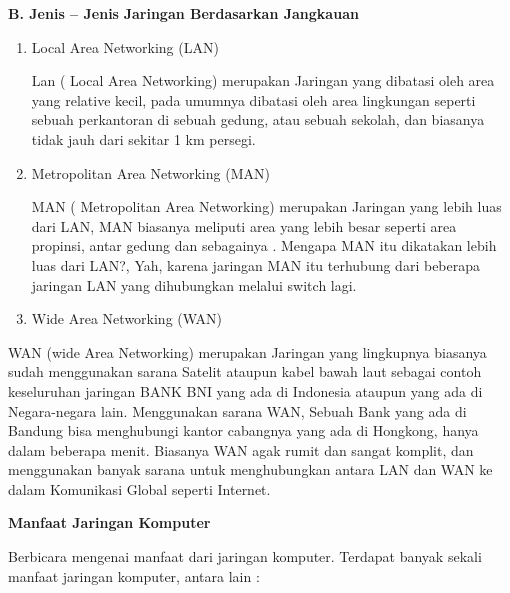 \noindent 
\textbf{B. Jenis – Jenis}\textbf{ Jaringan Berdasarkan Jangkauan} \par
\noindent 
\begin{enumerate}
\item Local Area Networking (LAN) \par
Lan ( Local Area Networking) merupakan Jaringan yang dibatasi oleh area yang relative kecil, pada umumnya dibatasi oleh area lingkungan seperti sebuah perkantoran di sebuah gedung, atau sebuah sekolah, dan biasanya tidak jauh dari sekitar 1 km persegi. \par
\noindent 
\item Metropolitan Area Networking (MAN) \par
MAN ( Metropolitan Area Networking) merupakan Jaringan yang lebih luas dari LAN, MAN biasanya meliputi area yang lebih besar seperti area propinsi, antar gedung dan sebagainya . Mengapa MAN itu dikatakan lebih luas dari LAN?, Yah, karena jaringan MAN itu terhubung dari beberapa jaringan LAN yang dihubungkan melalui switch lagi. \par
\vspace{12pt}
\noindent 
\item Wide Area Networking (WAN)\end{enumerate}
 \par
WAN (wide Area Networking) merupakan Jaringan yang lingkupnya biasanya sudah menggunakan sarana Satelit ataupun kabel bawah laut sebagai contoh keseluruhan jaringan BANK BNI yang ada di Indonesia ataupun yang ada di Negara-negara lain. Menggunakan sarana WAN, Sebuah Bank yang ada di Bandung bisa menghubungi kantor cabangnya yang ada di Hongkong, hanya dalam beberapa menit. Biasanya WAN agak rumit dan sangat komplit, dan menggunakan banyak sarana untuk menghubungkan antara LAN dan WAN ke dalam Komunikasi Global seperti Internet. \par
\vspace{12pt}
\noindent 
\textbf{Manfaat Jaringan Komputer} \par
Berbicara mengenai manfaat dari jaringan komputer. Terdapat banyak sekali manfaat jaringan komputer, antara lain : \par
\noindent 
